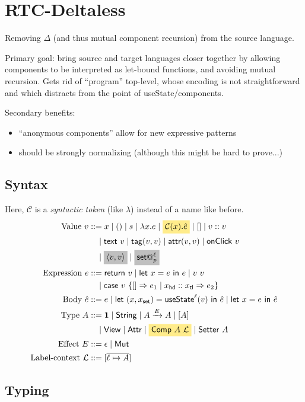 \documentclass{article}
\makeatletter
\newcommand{\num}[1]{\overline{#1}}
\newcommand{\mf}[1]{\mathsf{#1}}
\newcommand{\mc}[1]{\mathcal{#1}}
\newcommand{\mb}[1]{\mathbf{#1}}
\newcommand{\mhl}[1]{\colorbox{LightGoldenrod1}{$#1$}}
\newcommand{\mgrey}[1]{\colorbox{lightgray}{$#1$}}
\newcommand{\pair}[2]{\langle #1, #2 \rangle}
\newcommand{\map}[2]{[\num{#1 \mapsto #2}]}
\newcommand{\arrow}[1]{\xrightarrow{#1}}
\newcommand{\ptp}{A}
\newcommand{\tone}{\mb{1}}
\newcommand{\tstr}{\mf{String}}
\newcommand{\tview}{\mf{View}}
\newcommand{\tattr}{\mf{Attr}}
\newcommand{\tcomp}[1]{\mf{Comp}\ #1}
\newcommand{\tset}[1]{\mf{Setter}\ #1}
\newcommand{\emut}{\mf{Mut}}
\newcommand{\C}{\mc{C}}
\newcommand{\vtxt}[1]{\mf{text}\ #1}
\newcommand{\vtag}[2]{\mf{tag}(#1, #2)}
\newcommand{\vattr}[2]{\mf{attr}(#1, #2)}
\newcommand{\vclick}[1]{\mf{onClick}\ #1}
\newcommand{\vset}[2]{\mf{set}@^{#1}_{#2}}
\newcommand{\Ell}{\mc{L}}
\newcommand{\elet}[3]{\mf{let}\ #1 = #2\ \mf{in}\ #3}
\newcommand{\eret}[1]{\mf{return}\ #1}
\newcommand{\ecase}[5]{\mf{case}\ #1\ \{#2 \Rightarrow #3 \mid #4 \Rightarrow #5\}}
\newcommand{\estate}[4]{\mf{let}\ (#1, #1_{\mf{set}}) = \mf{useState}^{#2}(#3)\ \mf{in}\ #4}
\makeatother
\begin{document}
\section{RTC-Deltaless}

Removing $\Delta$ (and thus mutual component recursion)
from the source language.

Primary goal: bring source and target languages closer together
by allowing components to be interpreted as let-bound functions,
and avoiding mutual recursion. Gets rid of ``program'' top-level,
whose encoding is not straightforward
and which distracts from the point of useState/components.

Secondary benefits:
\begin{itemize}
\item ``anonymous components'' allow for new expressive patterns
\item should be strongly normalizing
(although this might be hard to prove...)
\end{itemize}

\subsection{Syntax}

Here, $\C$ is a \emph{syntactic token} (like $\lambda$)
instead of a name like before.
\begin{align*}
\text{Value } v &::= x \mid () \mid s 
\mid \lambda x.e \mid \mhl{\C(x).\hat{e}}
\mid [] \mid v :: v\\
&\quad\mid \vtxt{v} \mid \vtag{v}{v}
\mid \vattr{v}{v} \mid \vclick{v}\\
&\quad\mid \mgrey{\pair{v}{v}} \mid \mgrey{\vset{\ell}{p}}\\
\text{Expression } e &::= \eret{v} \mid \elet{x}{e}{e} \mid v\ v \\
&\quad\mid \ecase{v}{[]}{e_1}{x_\mf{hd} :: x_\mf{tl}}{e_2}\\
\text{Body }\hat{e} &::= e \mid \estate{x}{\ell}{v}{\hat{e}} \mid \elet{x}{e}{\hat{e}}\\
\text{Type } \ptp &::= \tone \mid \tstr \mid \ptp \arrow{E} \ptp
\mid [\ptp] \\
&\quad\mid \tview \mid \tattr
\mid \mhl{\tcomp{\ptp\ \Ell}} \mid \tset{\ptp}\\
\text{Effect } E &::= \epsilon \mid \emut\\
\text{Label-context }\Ell &::= \map{\ell}{\ptp}
\end{align*}

\subsection{Typing}
\end{document}
